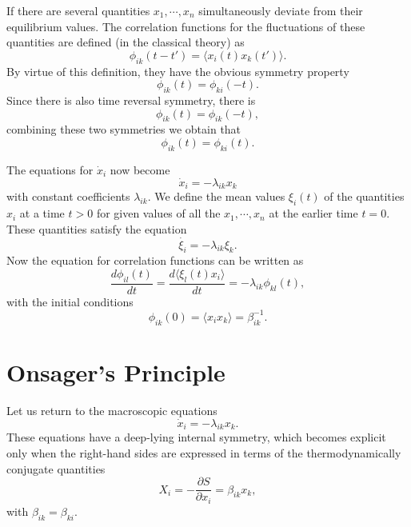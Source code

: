 \documentclass{book}
\newcommand{\average}[1]{\langle#1\rangle}
\numberwithin{equation}{section}
\begin{document}
If there are several quantities $x_1,\cdots,x_n$ simultaneously
deviate from their equilibrium values. The correlation functions for
the fluctuations of these quantities are defined (in the classical
theory) as
\begin{equation}
  \phi_{ik}(t-t')=\average{x_i(t)x_k(t')}.
\end{equation}
By virtue of this definition, they have the obvious symmetry property
\begin{equation}
  \phi_{ik}(t)=\phi_{ki}(-t).
\end{equation}
Since there is also time reversal symmetry, there is
\begin{equation}
  \phi_{ik}(t)=\phi_{ik}(-t),
\end{equation}
combining these two symmetries we obtain that
\begin{equation}
  \phi_{ik}(t)=\phi_{ki}(t).
\end{equation}

The equations for $\dot{x}_i$ now become
\begin{equation}
  \dot{x}_i=-\lambda_{ik}x_k
\end{equation}
with constant coefficients $\lambda_{ik}$. We define the mean values
$\xi_i(t)$ of the quantities $x_i$ at a time $t>0$ for given values of
all the $x_1,\cdots,x_n$ at the earlier time $t=0$. These quantities
satisfy the equation
\begin{equation}
  \dot{\xi_i}=-\lambda_{ik}\xi_k.
\end{equation}
Now the equation for correlation functions can be written as
\begin{equation}
  \frac{d\phi_{il}(t)}{dt}=\frac{d\average{\xi_l(t)x_i}}{dt}=
    -\lambda_{ik}\phi_{kl}(t),
\end{equation}
with the initial conditions
\begin{equation}
  \phi_{ik}(0)=\average{x_ix_k}=\beta^{-1}_{ik}.
\end{equation}

\section{Onsager's Principle}
Let us return to the macroscopic equations
\begin{equation}
  \dot{x}_i=-\lambda_{ik}x_k.
\end{equation}
These equations have a deep-lying internal symmetry, which becomes
explicit only when the right-hand sides are expressed in terms of the 
thermodynamically conjugate quantities
\begin{equation}
  X_i=-\frac{\partial S}{\partial x_i}=\beta_{ik}x_k,
\end{equation}
with $\beta_{ik}=\beta_{ki}$. 
\end{document}
